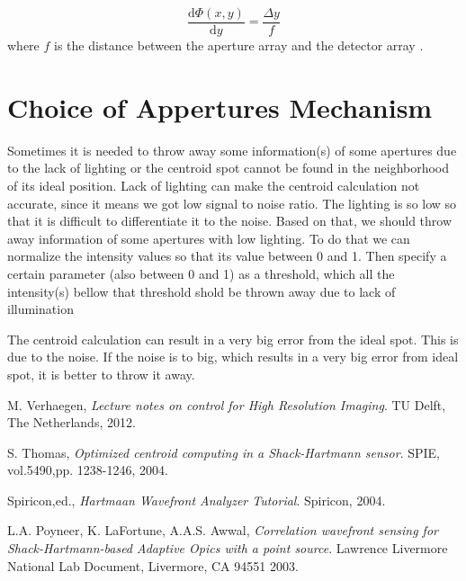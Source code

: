 \documentclass{article}
\begin{document}
\begin{equation}
\frac{\mathrm{d} \Phi(x,y)}{\mathrm{d} y}=\frac{\Delta y}{f}
\end{equation}
where $f$ is the distance between the aperture array and the detector array \cite{spiricon04}.

\section{Choice of Appertures Mechanism}

Sometimes it is needed to throw away some information(s) of some apertures due to the lack of lighting or the centroid spot cannot be found in the neighborhood of its ideal position. Lack of lighting can make the centroid calculation not accurate, since it means we got low signal to noise ratio. The lighting is so low so that it is difficult to differentiate it to the noise. Based on that, we should throw away information of some apertures with low lighting. To do that we can normalize the intensity values so that its value between 0 and 1. Then specify a certain parameter (also between 0 and 1) as a threshold, which all the intensity(s) bellow that threshold shold be thrown away due to lack of illumination

The centroid calculation can result in a very big error from the ideal spot. This is due to the noise. If the noise is to big, which results in a very big error from ideal spot, it is better to throw it away. 


\begin{thebibliography}{9}

  M. Verhaegen,
  \emph{Lecture notes on control for High Resolution Imaging}.
  TU Delft, 
  The Netherlands,
  2012.
  
  S. Thomas,
  \emph{Optimized centroid computing in a Shack-Hartmann sensor}.
  SPIE, 
  vol.5490,pp. 1238-1246,
  2004. 
  
  Spiricon,ed.,
  \emph{Hartmaan Wavefront Analyzer Tutorial}.
  Spiricon, 
  2004.
  
  L.A. Poyneer, K. LaFortune, A.A.S. Awwal,
  \emph{Correlation wavefront sensing for Shack-Hartmann-based Adaptive Opics with a point source}.
  Lawrence Livermore National Lab Document,
  Livermore, CA 94551
  2003.  

\end{thebibliography}
\end{document}
